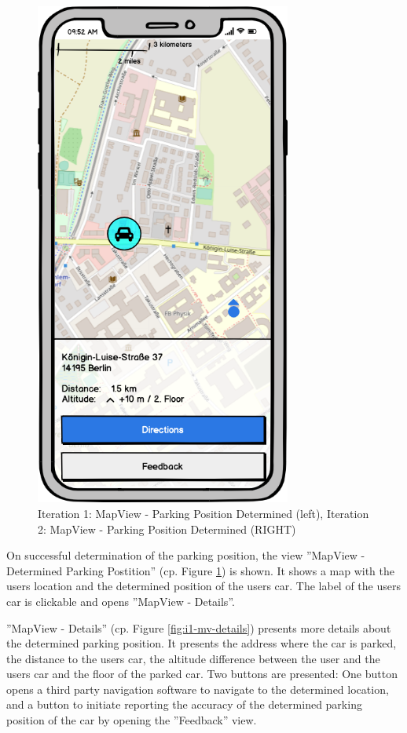 \begin{figure}[h]
\begin{minipage}[b]{0.45\textwidth}
    \includegraphics[width=0.75\textwidth]{images/UI/Iteration2-MapView-ParkingPositionDetermined.png}
  \end{minipage}
  \caption{Iteration 1: MapView - Parking Position Determined (left), Iteration 2: MapView - Parking Position Determined (RIGHT)}
  \label{fig:i1-i2}
\end{figure}



On successful determination of the parking position, the view ''MapView - Determined Parking Postition'' (cp. Figure \ref{fig:i1-i2}) is shown. It shows a map with the users location and the determined position of the users car. The label of the users car is clickable and opens ''MapView - Details''. 

''MapView - Details'' (cp. Figure \ref{fig:i1-mv-details}) presents more details about the determined parking position. It presents the address where the car is parked, the distance to the users car, the altitude difference between the user and the users car and the floor of the parked car. Two buttons are presented: One button opens a third party navigation software to navigate to the determined location, and a button to initiate reporting the accuracy of the determined parking position of the car by opening the ''Feedback'' view.

